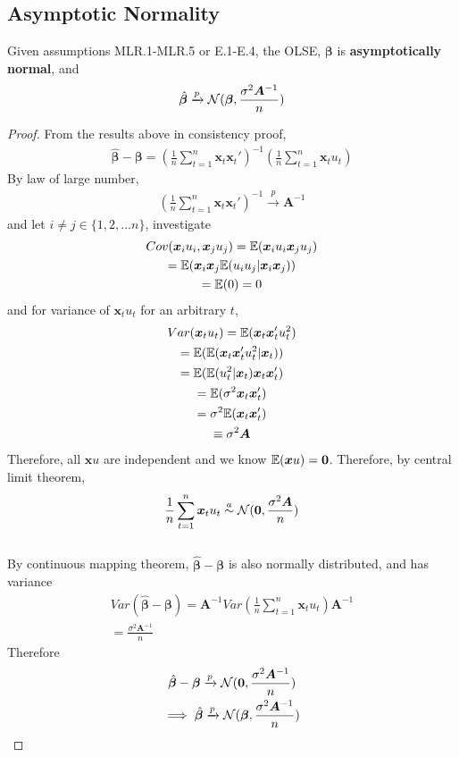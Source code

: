 \documentclass[]{article}
\begin{document}
	\subsection{Asymptotic Normality}
		\begin{theorem}
			Given assumptions MLR.1-MLR.5 or E.1-E.4, the OLSE, $\bm{\beta}$ is \textbf{asymptotically normal}, and
			\[
				\hat{\bm{\beta}} \xrightarrow{p} \mathcal{{N}}(\bm{\beta}, \frac{\sigma^2 \bm{A}^{-1}}{n})
			\]
		\end{theorem}
			\begin{proof}
				From the results above in consistency proof, 
				\begin{gather*}
					\hat{\bm{\beta}} - \bm{\beta} = (\frac{1}{n} \sum_{t=1}^n \bm{x}_t \bm{x}_t')^{-1} (\frac{1}{n} \sum_{t=1}^n \bm{x}_t u_t)  
				\end{gather*}
				By law of large number, 
				\begin{gather*}
					(\frac{1}{n} \sum_{t=1}^n \bm{x}_t \bm{x}_t')^{-1} \xrightarrow{p} \bm{A}^{-1}
				\end{gather*}
				and let $i \neq j \in \{1, 2, \dots n\}$, investigate
				\begin{gather*}
					Cov(\bm{x}_i u_i, \bm{x}_j u_j) = \mathbb{E}({\bm{x}_i u_i  \bm{x}_j u_j}) \\
					= \mathbb{E}({\bm{x}_i \bm{x}_j \mathbb{E}({u_i u_j | \bm{x}_i \bm{x}_j})}) \\
					= \mathbb{E}({0}) = 0
				\end{gather*}
				and for variance of $\bm{x}_t u_t$ for an arbitrary $t$,
				\begin{gather*}
					Var(\bm{x}_t u_t) = \mathbb{E}({\bm{x}_t \bm{x}_t' u_t^2}) \\
					= \mathbb{E}({\mathbb{E}({\bm{x}_t \bm{x}_t' u_t^2 | \bm{x}_t})}) \\
					= \mathbb{E}({\mathbb{E}({u_t^2|\bm{x}_t}) \bm{x}_t \bm{x}_t'}) \\
					= \mathbb{E}({\sigma^2 \bm{x}_t \bm{x}_t'}) \\
					= \sigma^2 \mathbb{E}({\bm{x}_t \bm{x}_t'}) \\
					\equiv \sigma^2 \bm{A}
				\end{gather*}
				Therefore, all $\bm{x} u$ are independent and we know $\mathbb{E}({\bm{x} u}) = \bm{0}$. Therefore, by central limit theorem,
				\[
					\frac{1}{n} \sum_{t=1}^n \bm{x}_t u_t \overset{a}{\sim} \mathcal{{N}}(\bm{0}, \frac{\sigma^2 \bm{A}}{n})
				\] \\
				By continuous mapping theorem, $\hat{\bm{\beta}} - \bm{\beta}$ is also normally distributed, and has variance
				\begin{gather*}
					Var(\hat{\bm{\beta}} - \bm{\beta}) = \bm{A}^{-1} Var(\frac{1}{n} \sum_{t=1}^n \bm{x}_t u_t) \bm{A}^{-1} \\
					= \frac{\sigma^2 \bm{A}^{-1}}{n}
				\end{gather*}
				Therefore
				\begin{gather*}
					\hat{\bm{\beta}} - \bm{\beta} \xrightarrow{p} \mathcal{{N}}(\bm{0}, \frac{\sigma^2 \bm{A}^{-1}}{n}) \\
					\implies \hat{\bm{\beta}} \xrightarrow{p} \mathcal{{N}}(\bm{\beta}, \frac{\sigma^2 \bm{A}^{-1}}{n})
				\end{gather*}
			\end{proof}
\end{document}

